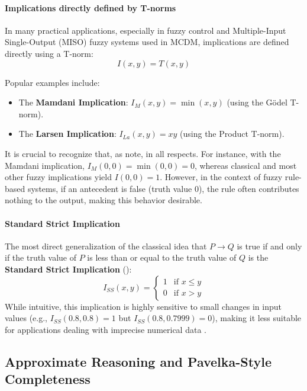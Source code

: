 \paragraph{Implications directly defined by T-norms}
In many practical applications, especially in fuzzy control and Multiple-Input Single-Output (MISO) fuzzy systems used in MCDM, implications are defined directly using a T-norm:
\[I(x,y) = T(x,y)\]
\begin{example}
Popular examples include:
\begin{itemize}
    \item The \textbf{Mamdani Implication}: $I_M(x,y) = \min(x,y)$ (using the Gödel T-norm).
    \item The \textbf{Larsen Implication}: $I_{La}(x,y) = xy$ (using the Product T-norm).
\end{itemize}
\end{example}
It is crucial to recognize that, as \cite[p.60]{FULLER2} note,  in all respects. For instance, with the Mamdani implication, $I_M(0,0) = \min(0,0) = 0$, whereas classical and most other fuzzy implications yield $I(0,0)=1$. However, in the context of fuzzy rule-based systems, if an antecedent is false (truth value 0), the rule often contributes nothing to the output, making this behavior desirable.

\paragraph{Standard Strict Implication}
The most direct generalization of the classical idea that $P \rightarrow Q$ is true if and only if the truth value of $P$ is less than or equal to the truth value of $Q$ is the \textbf{Standard Strict Implication} (\cite[p.58]{FULLER2}):
\[I_{SS}(x,y) = \begin{cases} 1 & \text{if } x \le y \\ 0 & \text{if } x > y \end{cases}\]
While intuitive, this implication is highly sensitive to small changes in input values (e.g., $I_{SS}(0.8, 0.8)=1$ but $I_{SS}(0.8, 0.7999)=0$), making it less suitable for applications dealing with imprecise numerical data \cite[p.58]{FULLER2}.

\subsection{Approximate Reasoning and Pavelka-Style Completeness}

